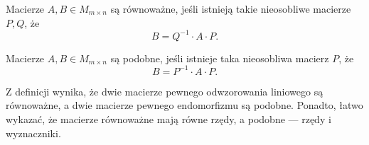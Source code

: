 \begin{definition}
    \label{d:matrix equivalence}
    Macierze $A, B \in M_{m\times n}$ są równoważne, jeśli istnieją takie nieosobliwe macierze $P, Q$, że
    \[ B = Q^{-1} \cdot A \cdot P. \]
\end{definition}

\begin{definition}
    \label{d:matrix similarity}
    Macierze $A, B \in M_{m\times n}$ są podobne, jeśli istnieje taka nieosobliwa macierz $P$, że
    \[ B = P^{-1} \cdot A \cdot P. \]
\end{definition}

Z definicji wynika, że dwie macierze pewnego odwzorowania liniowego są równoważne, a dwie macierze pewnego endomorfizmu są podobne. Ponadto, łatwo wykazać, że macierze równoważne mają równe rzędy, a podobne --- rzędy i wyznaczniki.